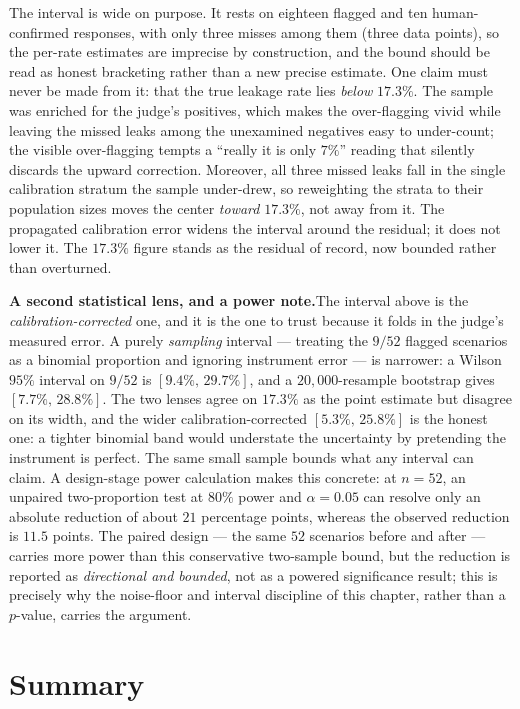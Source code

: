 \documentclass[11pt,a4paper]{report}
\begin{document}
The interval is wide on purpose. It rests on eighteen flagged and ten human-confirmed
responses, with only three misses among them (three data points), so the per-rate estimates
are imprecise by construction, and the bound should be read as honest bracketing rather than a
new precise estimate. One claim must never be made from it: that the true leakage rate lies
\emph{below} $17.3\%$. The sample was enriched for the judge's positives, which makes the
over-flagging vivid while leaving the missed leaks among the unexamined negatives easy to
under-count; the visible over-flagging tempts a ``really it is only $7\%$'' reading that
silently discards the upward correction. Moreover, all three missed leaks fall in the single
calibration stratum the sample under-drew, so reweighting the strata to their population sizes
moves the center \emph{toward} $17.3\%$, not away from it. The propagated calibration error
widens the interval around the residual; it does not lower it. The $17.3\%$ figure stands as
the residual of record, now bounded rather than overturned.

\textbf{A second statistical lens, and a power note.}\quad The interval above is the
\emph{calibration-corrected} one, and it is the one to trust because it folds in the judge's measured
error. A purely \emph{sampling} interval --- treating the $9/52$ flagged scenarios as a binomial
proportion and ignoring instrument error --- is narrower: a Wilson $95\%$ interval on $9/52$ is
$[9.4\%,\,29.7\%]$, and a $20{,}000$-resample bootstrap gives $[7.7\%,\,28.8\%]$. The two lenses agree
on $17.3\%$ as the point estimate but disagree on its width, and the wider calibration-corrected
$[5.3\%,\,25.8\%]$ is the honest one: a tighter binomial band would understate the uncertainty by
pretending the instrument is perfect. The same small sample bounds what any interval can claim. A
design-stage power calculation makes this concrete: at $n = 52$, an unpaired two-proportion test at
$80\%$ power and $\alpha = 0.05$ can resolve only an absolute reduction of about $21$ percentage
points, whereas the observed reduction is $11.5$ points. The paired design --- the same $52$ scenarios
before and after --- carries more power than this conservative two-sample bound, but the reduction is
reported as \emph{directional and bounded}, not as a powered significance result; this is precisely
why the noise-floor and interval discipline of this chapter, rather than a $p$-value, carries the
argument.

\section{Summary}
\label{sec:ch5-summary}
\end{document}
